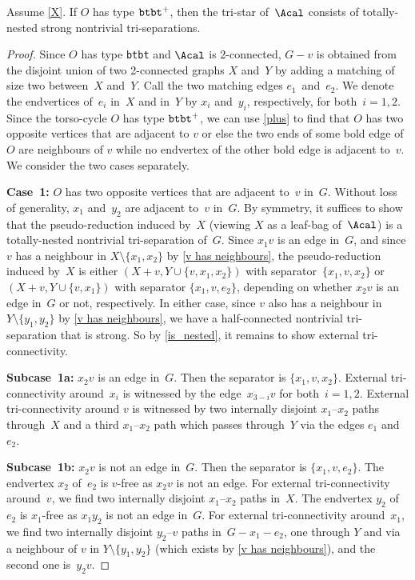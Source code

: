 \documentclass{aic}
\theoremstyle{plain}
\theoremstyle{definition}
\theoremstyle{plain}
\theoremstyle{plain}
\newcommand{\sm}{\setminus}
\newcommand{\ty}[1]{{\tt#1}}
\begin{document}
\begin{lem}\label{o4_not_alternate}
Assume \autoref{X}.
If $O$ has type $\ty{btbt}^+$, then the tri-star of~$\Acal$ consists of totally-nested strong nontrivial tri-separations.
\end{lem}

\begin{proof}
Since $O$ has type \ty{btbt} and $\Acal$ is 2-connected, $G-v$ is obtained from the disjoint union of two 2-connected graphs $X$ and~$Y$ 
by adding a matching of size two between~$X$ and~$Y$. Call the two matching edges $e_1$~and~$e_2$.
We denote the endvertices of~$e_i$ in~$X$ and in~$Y$ by $x_i$ and~$y_i$, respectively, for both~$i=1,2$.
Since the torso-cycle $O$ has type $\ty{btbt}^+$, we can use \autoref{plus} to find that $O$ has two opposite vertices that are adjacent to $v$ or else the two ends of some bold edge of~$O$ are neighbours of $v$ while no endvertex of the other bold edge is adjacent to~$v$.
We consider the two cases separately.

\textbf{Case~1:} $O$ has two opposite vertices that are adjacent to~$v$ in~$G$.
Without loss of generality, $x_1$ and~$y_2$ are adjacent to~$v$ in~$G$.
By symmetry, it suffices to show that the pseudo-reduction induced by~$X$ (viewing $X$ as a leaf-bag of~$\Acal$) is a totally-nested nontrivial tri-separation of~$G$.
Since $x_1 v$ is an edge in~$G$, and since $v$ has a neighbour in $X\sm \{x_1,x_2\}$ by \autoref{v has neighbours}, the pseudo-reduction induced by~$X$ is either $(X+v,Y\cup\{v,x_1,x_2\})$ with separator~$\{x_1,v,x_2\}$ or $(X+v,Y\cup\{v,x_1\})$ with separator $\{x_1,v,e_2\}$, depending on whether $x_2v$ is an edge in~$G$ or not, respectively.
In either case, since $v$ also has a neighbour in $Y\sm\{y_1,y_2\}$ by \autoref{v has neighbours}, we have a half-connected nontrivial tri-separation that is strong.
So by \autoref{is_nested}, it remains to show external tri-connectivity.

\textbf{Subcase~1a:} $x_2v$ is an edge in~$G$.
Then the separator is $\{x_1,v,x_2\}$.
External tri-connectivity around~$x_i$ is witnessed by the edge~$x_{3-i}v$ for both~$i=1,2$.
External tri-connectivity around $v$ is witnessed by two internally disjoint $x_1$--$x_2$ paths through~$X$ and a third $x_1$--$x_2$ path which passes through~$Y$ via the edges $e_1$ and~$e_2$.

\textbf{Subcase~1b:} $x_2v$ is not an edge in~$G$.
Then the separator is $\{x_1,v,e_2\}$.
The endvertex $x_2$ of~$e_2$ is $v$-free as $x_2v$ is not an edge.
For external tri-connectivity around~$v$, we find two internally disjoint $x_1$--$x_2$ paths in~$X$.
The endvertex $y_2$ of~$e_2$ is $x_1$-free as $x_1 y_2$ is not an edge in~$G$.
For external tri-connectivity around~$x_1$, we find two internally disjoint $y_2$--$v$ paths in~$G-x_1-e_2$, one through $Y$ and via a neighbour of $v$ in $Y\sm\{y_1,y_2\}$ (which exists by \autoref{v has neighbours}), and the second one is~$y_2 v$.


\end{proof}
\end{document}
